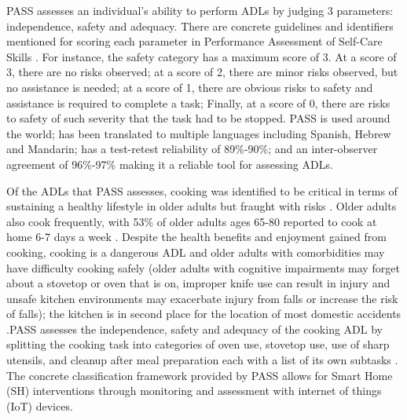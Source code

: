 
PASS assesses an individual’s ability to perform ADLs by judging 3 parameters: independence, safety and adequacy. There are concrete guidelines and identifiers mentioned for scoring each parameter in Performance Assessment of Self-Care Skills \cite{rogers_performance_2014}. For instance, the safety category has a maximum score of 3. At a score of 3, there are no risks observed; at a score of 2, there are minor risks observed, but no assistance is needed; at a score of 1, there are obvious risks to safety and assistance is required to complete a task; Finally, at a score of 0, there are risks to safety of such severity that the task had to be stopped. PASS is used around the world; has been translated to multiple languages including Spanish, Hebrew and Mandarin; has a test-retest reliability of 89\%-90\%; and an inter-observer agreement of 96\%-97\% \cite{chisholm_evaluating_2014} making it a reliable tool for assessing ADLs. 


Of the ADLs that PASS assesses, cooking was identified to be critical in terms of sustaining a healthy lifestyle in older adults \cite{bouchard_smart_2020} but fraught with risks \cite{yared_cooking_2015}. Older adults also cook frequently, with 53\% of older adults ages 65-80 reported to cook at home 6-7 days a week \cite{malani_joy_2020}. Despite the health benefits and enjoyment gained from cooking, cooking is a dangerous ADL and older adults with comorbidities may have difficulty cooking safely (older adults with cognitive impairments may forget about a stovetop or oven that is on, improper knife use can result in injury and unsafe kitchen environments may exacerbate injury from falls or increase the risk of falls); the kitchen is in second place for the location of most domestic accidents \cite{yared_cooking_2015}.PASS assesses the independence, safety and adequacy of the cooking ADL by splitting the cooking task into categories of oven use, stovetop use, use of sharp utensils, and cleanup after meal preparation each with a list of its own subtasks \cite{rogers_performance_2014}. The concrete classification framework provided by PASS allows for Smart Home (SH) interventions through monitoring and assessment with internet of things (IoT) devices.

